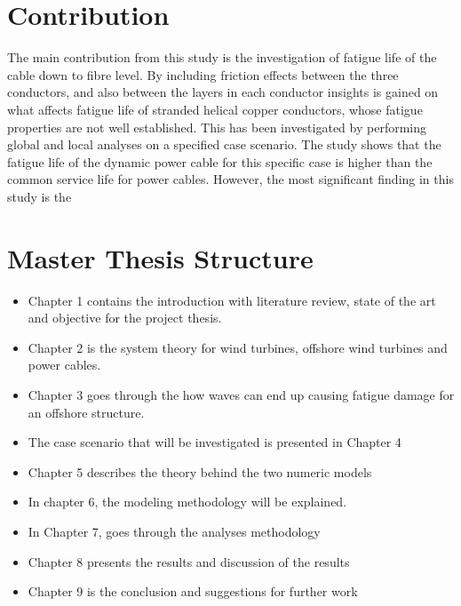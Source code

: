 \section{Contribution}
The main contribution from this study is the investigation of fatigue life of the cable down to fibre level. By including friction effects between the three conductors, and also between the layers in each conductor insights is gained on what affects fatigue life of stranded helical copper conductors, whose fatigue properties are not well established. This has been investigated by performing global and local analyses on a specified case scenario. The study shows that the fatigue life of the dynamic power cable for this specific case is higher than the common service life for power cables. However, the most significant finding in this study is the 
\section{Master Thesis Structure}
\begin{itemize}
    \item Chapter 1 contains the introduction with literature review, state of the art and objective for the project thesis.
     \item Chapter 2 is the system theory for wind turbines, offshore wind turbines and power cables.
      \item Chapter 3 goes through the how waves can end up causing fatigue damage for an offshore structure. 
      \item The case scenario that will be investigated is presented in Chapter 4
      \item Chapter 5 describes the theory behind the two numeric models
      \item In chapter 6, the modeling methodology will be explained.
      \item In Chapter 7, goes through the analyses methodology
      \item Chapter 8 presents the results and discussion of the results
      \item Chapter 9 is the conclusion and suggestions for further work
\end{itemize}

